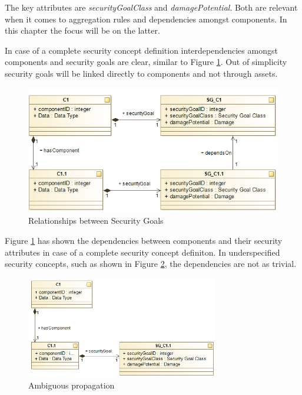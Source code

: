 The key attributes are \textit{securityGoalClass} and \textit{damagePotential}. Both are relevant when it comes to aggregation rules and dependencies amongst components. In this chapter the focus will be on the latter.

In case of a complete security concept definition interdependencies amongst components and security goals are clear, similar to Figure \ref{fig:subcomponent}. Out of simplicity security goals will be linked directly to components and not through assets.

\begin{figure}[H]
\centering
\includegraphics[scale=0.75]{pictures/rel_component.png}
\caption{Relationships between Security Goals}
\label{fig:subcomponent}
\end{figure} 

Figure \ref{fig:subcomponent} has shown the dependencies between components and their security attributes in case of a complete security concept definiton. In underspecified security concepts, such as shown in Figure \ref{fig:subcomponent_dilemma}, the dependencies are not as trivial. 

\begin{figure}[H]
\centering
\includegraphics[width=0.75\textwidth]{pictures/sg_dilemma_no_goal.png}
\caption{Ambiguous propagation}
\label{fig:subcomponent_dilemma}
\end{figure} 

